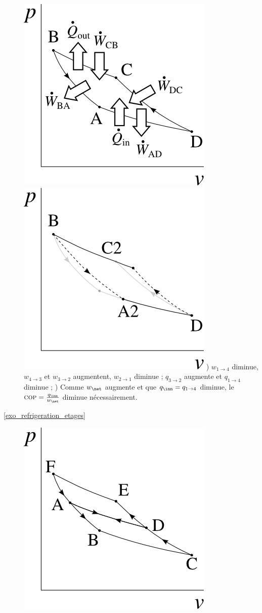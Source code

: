 \begin{description}
					\includegraphics[width=\solutiondiagramwidth]{images/exo_sol_pv_carnot_refrigerateur_transferts.png}
					\includegraphics[width=\solutiondiagramwidth]{images/exo_sol_pv_carnot_refrigerateur_irreversibilites.png}
					) $w_{1\to 4}$ diminue, $w_{4\to 3}$ et $w_{3\to 2}$ augmentent, $w_{2\to 1}$ diminue ; $q_{3\to 2}$ augmente et $q_{1\to 4}$ diminue  ;
					) Comme $w_\net$ augmente et que $q_\inn = q_{1\to 4}$ diminue, le $\textsc{cop} = \frac{q_\inn}{w_\net}$ diminue nécessairement.
		\item [\ref{exo_refrigeration_etages}]
					\includegraphics[height=\solutiondiagramwidth]{images/exo_sol_pv_refrigeration_etages_1.png}

\end{description}

